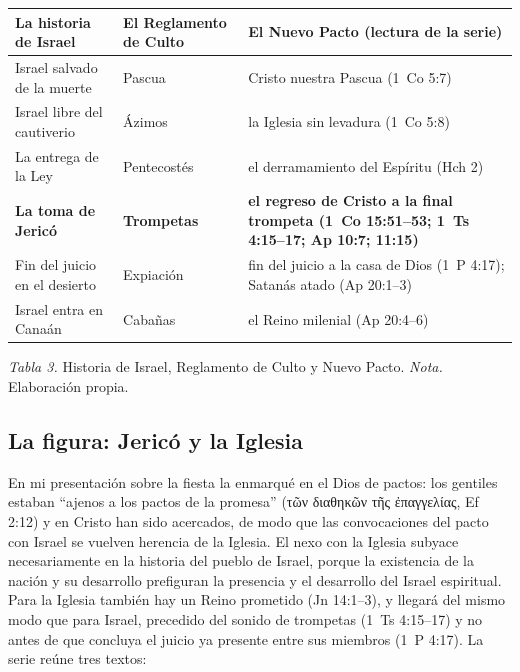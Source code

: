 \documentclass[11pt,letterpaper]{article}
\newcommand{\grc}[1]{\foreignlanguage{ancientgreek}{#1}}
\begin{document}
\begin{center}\begin{minipage}{\linewidth}\centering\small\renewcommand{\arraystretch}{1.18}
\begin{tabular}{@{}L{4.2cm}L{3.4cm}L{6.8cm}@{}}
\toprule
\textbf{La historia de Israel} & \textbf{El Reglamento de Culto} & \textbf{El Nuevo Pacto (lectura de la serie)} \\ \midrule
Israel salvado de la muerte & Pascua & Cristo nuestra Pascua (1~Co 5:7) \\
Israel libre del cautiverio & Ázimos & la Iglesia sin levadura (1~Co 5:8) \\
La entrega de la Ley & Pentecostés & el derramamiento del Espíritu (Hch 2) \\
\textbf{La toma de Jericó} & \textbf{Trompetas} & \textbf{el regreso de Cristo a la final trompeta (1~Co 15:51--53; 1~Ts 4:15--17; Ap 10:7; 11:15)} \\
Fin del juicio en el desierto & Expiación & fin del juicio a la casa de Dios (1~P 4:17); Satanás atado (Ap 20:1--3) \\
Israel entra en Canaán & Cabañas & el Reino milenial (Ap 20:4--6) \\
\bottomrule
\end{tabular}\par
{\footnotesize\color{sepia}\textit{Tabla 3.} Historia de Israel, Reglamento de Culto y Nuevo Pacto. \textit{Nota.} Elaboración propia.}
\end{minipage}\end{center}

\subsection{La figura: Jericó y la Iglesia}
En mi presentación sobre la fiesta la enmarqué en el Dios de pactos: los gentiles estaban ``ajenos a los pactos de la promesa'' (\grc{τῶν διαθηκῶν τῆς ἐπαγγελίας}, Ef 2:12) y en Cristo han sido acercados, de modo que las convocaciones del pacto con Israel se vuelven herencia de la Iglesia. El nexo con la Iglesia subyace necesariamente en la historia del pueblo de Israel, porque la existencia de la nación y su desarrollo prefiguran la presencia y el desarrollo del Israel espiritual. Para la Iglesia también hay un Reino prometido (Jn 14:1--3), y llegará del mismo modo que para Israel, precedido del sonido de trompetas (1~Ts 4:15--17) y no antes de que concluya el juicio ya presente entre sus miembros (1~P 4:17). La serie reúne tres textos:
\end{document}
